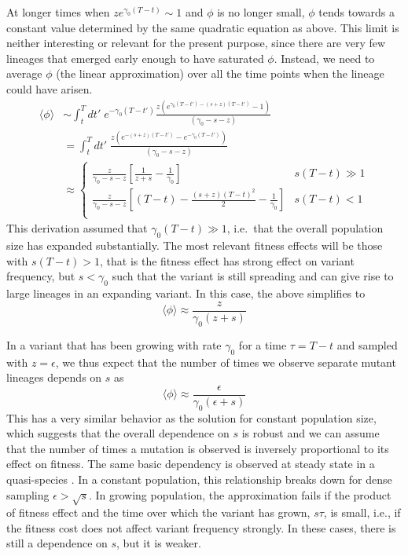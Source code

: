 \documentclass[9pt,twocolumn,twoside]{gsajnl_modified}
\begin{document}
At longer times when $z e^{\gamma_0 (T-t)}\sim 1$ and $\phi$ is no longer small, $\phi$ tends towards a constant value determined by the same quadratic equation as above.
This limit is neither interesting or relevant for the present purpose, since there are very few lineages that emerged early enough to have saturated $\phi$.
Instead, we need to average $\phi$ (the linear approximation) over all the time points when the lineage could have arisen.
\begin{equation}
    \begin{split}
        \langle \phi \rangle &\sim \int_t^T dt' \; e^{-\gamma_0(T-t')} \frac{z (e^{\gamma_0(T-t') - (s+z)(T-t')}-1)}{(\gamma_0 - s - z)}\\
        &= \int_t^T dt' \;  \frac{z (e^{-(s+z)(T-t')}-e^{-\gamma_0(T-t')})}{(\gamma_0 - s - z)}\\
        &\approx \begin{cases}
            \frac{z}{\gamma_0-s-z} [ \frac{1}{z+s} - \frac{1}{\gamma_0}] & s(T-t)\gg 1\\
            \frac{z}{\gamma_0-s-z} [ (T-t) - \frac{(s+z)(T-t)^2}{2} - \frac{1}{\gamma_0}] & s(T-t)<1 \\
        \end{cases}
    \end{split}
\end{equation}
This derivation assumed that $\gamma_0(T-t)\gg1$, i.e.~that the overall population size has expanded substantially.
The most relevant fitness effects will be those with $s(T-t)>1$, that is the fitness effect has strong effect on variant frequency, but $s<\gamma_0$ such that the variant is still spreading and can give rise to large lineages in an expanding variant.
In this case, the above simplifies to
\begin{equation}
    \langle \phi \rangle \approx \frac{z}{\gamma_0(z+s)}
\end{equation}


In a variant that has been growing with rate $\gamma_0$ for a time $\tau=T-t$ and sampled with $z=\epsilon$, we thus expect that the number of times we observe separate mutant lineages depends on $s$ as
\begin{equation}
    \langle \phi \rangle \approx \frac{\epsilon}{\gamma_0(\epsilon+s)}
\end{equation}
This has a very similar behavior as the solution for constant population size, which suggests that the overall dependence on $s$ is robust and we can assume that the number of times a mutation is observed is inversely proportional to its effect on fitness.
The same basic dependency is observed at steady state in a quasi-species \citep{zanini2017vivo}.
In a constant population, this relationship breaks down for dense sampling $\epsilon > \sqrt{s}$.
In growing population, the approximation fails if the product of fitness effect and the time over which the variant has grown, $s\tau$, is small, i.e., if the fitness cost does not affect variant frequency strongly.
In these cases, there is still a dependence on $s$, but it is weaker.
\end{document}

